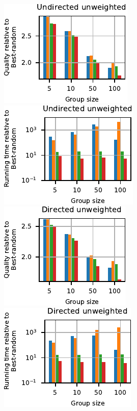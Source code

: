 \begin{figure}[tb]
\begin{subfigure}[t]{\textwidth}
\centering
\includegraphics[width=.24\textwidth]{./sources/plots/gh-gc-apx/quality-high-diameter-undirected-unweighted.pdf}
\includegraphics[width=.24\textwidth]{./sources/plots/gh-gc-apx/time-high-diameter-undirected-unweighted.pdf}
\includegraphics[width=.24\textwidth]{./sources/plots/gh-gc-apx/quality-high-diameter-directed-unweighted.pdf}
\includegraphics[width=.24\textwidth]{./sources/plots/gh-gc-apx/time-high-diameter-directed-unweighted.pdf}
\medskip


\end{subfigure}
\end{figure}
